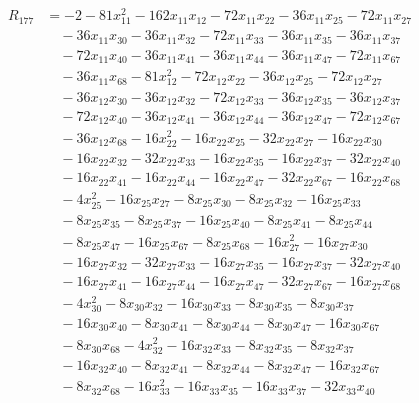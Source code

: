 \begin{align*}
R_{177} &= -2 -81 x_{11}^{2} -162 x_{11} x_{12} -72 x_{11} x_{22} -36 x_{11} x_{25} -72 x_{11} x_{27} \\
&\quad -36 x_{11} x_{30} -36 x_{11} x_{32} -72 x_{11} x_{33} -36 x_{11} x_{35} -36 x_{11} x_{37} \\
&\quad -72 x_{11} x_{40} -36 x_{11} x_{41} -36 x_{11} x_{44} -36 x_{11} x_{47} -72 x_{11} x_{67} \\
&\quad -36 x_{11} x_{68} -81 x_{12}^{2} -72 x_{12} x_{22} -36 x_{12} x_{25} -72 x_{12} x_{27} \\
&\quad -36 x_{12} x_{30} -36 x_{12} x_{32} -72 x_{12} x_{33} -36 x_{12} x_{35} -36 x_{12} x_{37} \\
&\quad -72 x_{12} x_{40} -36 x_{12} x_{41} -36 x_{12} x_{44} -36 x_{12} x_{47} -72 x_{12} x_{67} \\
&\quad -36 x_{12} x_{68} -16 x_{22}^{2} -16 x_{22} x_{25} -32 x_{22} x_{27} -16 x_{22} x_{30} \\
&\quad -16 x_{22} x_{32} -32 x_{22} x_{33} -16 x_{22} x_{35} -16 x_{22} x_{37} -32 x_{22} x_{40} \\
&\quad -16 x_{22} x_{41} -16 x_{22} x_{44} -16 x_{22} x_{47} -32 x_{22} x_{67} -16 x_{22} x_{68} \\
&\quad -4 x_{25}^{2} -16 x_{25} x_{27} -8 x_{25} x_{30} -8 x_{25} x_{32} -16 x_{25} x_{33} \\
&\quad -8 x_{25} x_{35} -8 x_{25} x_{37} -16 x_{25} x_{40} -8 x_{25} x_{41} -8 x_{25} x_{44} \\
&\quad -8 x_{25} x_{47} -16 x_{25} x_{67} -8 x_{25} x_{68} -16 x_{27}^{2} -16 x_{27} x_{30} \\
&\quad -16 x_{27} x_{32} -32 x_{27} x_{33} -16 x_{27} x_{35} -16 x_{27} x_{37} -32 x_{27} x_{40} \\
&\quad -16 x_{27} x_{41} -16 x_{27} x_{44} -16 x_{27} x_{47} -32 x_{27} x_{67} -16 x_{27} x_{68} \\
&\quad -4 x_{30}^{2} -8 x_{30} x_{32} -16 x_{30} x_{33} -8 x_{30} x_{35} -8 x_{30} x_{37} \\
&\quad -16 x_{30} x_{40} -8 x_{30} x_{41} -8 x_{30} x_{44} -8 x_{30} x_{47} -16 x_{30} x_{67} \\
&\quad -8 x_{30} x_{68} -4 x_{32}^{2} -16 x_{32} x_{33} -8 x_{32} x_{35} -8 x_{32} x_{37} \\
&\quad -16 x_{32} x_{40} -8 x_{32} x_{41} -8 x_{32} x_{44} -8 x_{32} x_{47} -16 x_{32} x_{67} \\
&\quad -8 x_{32} x_{68} -16 x_{33}^{2} -16 x_{33} x_{35} -16 x_{33} x_{37} -32 x_{33} x_{40} \\

\end{align*}
